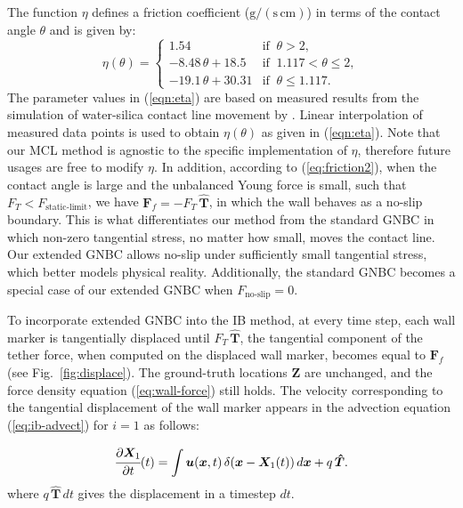 \documentclass[%
 aip,
 amsmath,amssymb,
 reprint,
 floatfix
]{revtex4-1}
\begin{document}
The function $\eta$ defines a friction coefficient ($\text{g}/(\text{s} \, \text{cm})$) in terms of the contact angle $\theta$ and is given by:
\begin{equation}
\eta(\theta) = 
\begin{cases}
    1.54 & \text{if   }\ \theta > 2, \\
    - 8.48\,\theta + 18.5 & \text{if   }\ 1.117 < \theta \le 2, \\
    - 19.1\,\theta + 30.31 & \text{if   }\ \theta \le 1.117. 
\end{cases}
\label{eqn:eta}
\end{equation}
The parameter values in (\ref{eqn:eta}) are based on measured results from the simulation of water-silica contact line movement by \citet{johansson2018molecular}. Linear interpolation of measured data points is used to obtain $\eta(\theta)$ as given in (\ref{eqn:eta}). Note that our MCL method is agnostic to the specific implementation of $\eta$, therefore future usages are free to modify $\eta$. In addition, according to (\ref{eq:friction2}), when the contact angle is large and the unbalanced Young force is small, such that $F_T < F_\text{static-limit}$, we have $\bm{F}_f = -F_T \, \bm{\hat{T}}$, in which the wall behaves as a no-slip boundary. This is what differentiates our method from the standard GNBC in which non-zero tangential stress, no matter how small, moves the contact line. Our extended GNBC allows no-slip under sufficiently small tangential stress, which better models physical reality. Additionally, the standard GNBC becomes a special case of our extended GNBC when $F_\text{no-slip} = 0$. 

To incorporate extended GNBC into the IB method, at every time step, each wall marker is tangentially displaced until $F_T \, \bm{\hat{T}}$, the tangential component of the tether force, when computed on the displaced wall marker, becomes equal to $\bm{F}_f$ (see Fig.~\ref{fig:displace}). The ground-truth locations $\bm{Z}$ are unchanged, and the force density equation (\ref{eq:wall-force}) still holds. The velocity corresponding to the tangential displacement of the wall marker appears in the advection equation (\ref{eq:ib-advect}) for $i = 1$ as follows: 

\begin{equation}
\cfrac{\partial\bm{X}_1}{\partial t}(t) =
    \int\bm{u}(\bm{x},t)\,\delta(\bm{x}-\bm{X}_1(t)) \, d\bm{x} + q \, \bm{\hat{T}}. 
    \label{eq:advect-w-mcl}
\end{equation}
where $q \, \bm{\hat{T}} \, dt$ gives the displacement in a timestep $dt$. 
\end{document}
